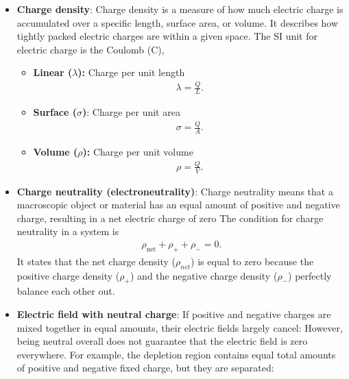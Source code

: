 \documentclass{report}
\begin{document}
\begin{itemize}
        \item \textbf{Charge density}: Charge density is a measure of how much electric charge is accumulated over a specific length, surface area, or volume. It describes how tightly packed electric charges are within a given space. The SI unit for electric charge is the Coulomb (C),
            \begin{itemize}
                \item \textbf{Linear ($\lambda$):} Charge per unit length
                    \begin{align*}
                        \lambda = \frac{Q}{L}
                    .\end{align*}
                \item \textbf{Surface ($\sigma$)}: Charge per unit area
                    \begin{align*}
                        \sigma = \frac{Q}{A}
                    .\end{align*}
                \item \textbf{Volume ($\rho$):} Charge per unit volume
                    \begin{align*}
                        \rho = \frac{Q}{V}
                    .\end{align*}
            \end{itemize}
        \item \textbf{Charge neutrality (electroneutrality)}: Charge neutrality means that a macroscopic object or material has an equal amount of positive and negative charge, resulting in a net electric charge of zero
            \bigbreak \noindent 
            The condition for charge neutrality in a system is
            \begin{align*}
                \rho_{\text{net}} + \rho_{+} + \rho_- = 0
            .\end{align*}
            It states that the net charge density (\(\rho _{net}\)) is equal to zero because the positive charge density ($\rho_{+}$) and the negative charge density ($\rho_{-}$) perfectly balance each other out.
        \item \textbf{Electric field with neutral charge}: If positive and negative charges are mixed together in equal amounts, their electric fields largely cancel:
            \bigbreak \noindent 
            However, being neutral overall does not guarantee that the electric field is zero everywhere. For example, the depletion region contains equal total amounts of positive and negative fixed charge, but they are separated:

\end{itemize}
\end{document}
